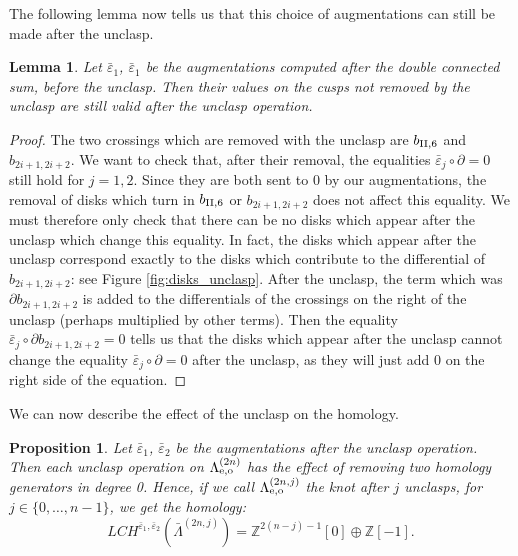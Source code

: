 \documentclass[11pt]{amsart}
\theoremstyle{plain}
\newtheorem{Prop}[defn]{Proposition}
\newtheorem{Lem}[defn]{Lemma}
\theoremstyle{remark}
\numberwithin{equation}{section}
\newcommand{\Z}{\ensuremath{\mathbb{Z}}}
\begin{document}
The following lemma now tells us that this choice of augmentations can still be made after the unclasp.
\begin{Lem}\label{lem:augmentations_unclasp} Let $\bar\varepsilon_1$, $\bar\varepsilon_1$ be the augmentations computed after the double connected sum, before the unclasp. Then their values on the cusps not removed by the unclasp are still valid after the unclasp operation.
\end{Lem} 
\begin{proof} The two crossings which are removed with the unclasp are $b_{\rm II,6}$ and $b_{2i+1,2i+2}$. We want to check that, after their removal, the equalities $\bar\varepsilon_j\circ\partial=0$ still hold for $j=1,2$. Since they are both sent to 0 by our augmentations, the removal of disks which turn in $b_{\rm II,6}$ or $b_{2i+1,2i+2}$ does not affect this equality. We must therefore only check that there can be no disks which appear after the unclasp which change this equality. In fact, the disks which appear after the unclasp correspond exactly to the disks which contribute to the differential of $b_{2i+1,2i+2}$: see Figure \ref{fig:disks_unclasp}. After the unclasp, the term which was $\partial b_{2i+1,2i+2}$ is added to the differentials of the crossings on the right of the unclasp (perhaps multiplied by other terms). Then the equality $\bar\varepsilon_j\circ\partial b_{2i+1,2i+2}=0$ tells us that the disks which appear after the unclasp cannot change the equality $\bar\varepsilon_j\circ\partial=0$ after the unclasp, as they will just add 0 on the right side of the equation.
\end{proof}

We can now describe the effect of the unclasp on the homology.

\begin{Prop}\label{prop:unclasp_1}
Let $\bar\varepsilon_1$, $\bar\varepsilon_2$ be the augmentations after the unclasp operation. Then each unclasp operation on $\Lambda^{(2n)}_{\rm e,o}$ has the effect of removing two homology generators in degree 0. Hence, if we call $\Lambda^{(2n,j)}_{\rm e,o}$ the knot after $j$ unclasps, for $j \in \{0,…,n-1\}$, we get the homology:
$$
LCH^{\bar\varepsilon_1,\bar\varepsilon_2}(\bar\Lambda^{(2n,j)}) =  \Z^{2(n-j)-1}[0] \oplus \Z[-1].
$$
\end{Prop} 
\end{document}
